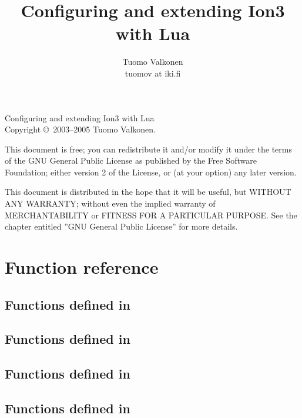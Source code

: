 \documentclass[english,a4paper,11pt,oldtoc,mctitle]{rapport3}
\title{Configuring and extending Ion3 with Lua}
\author{Tuomo Valkonen \\ tuomov at iki.fi}
\begin{document}
\maketitle

Configuring and extending Ion3 with Lua\\
Copyright \copyright\  2003--2005 Tuomo Valkonen.

This document is free; you can redistribute it and/or modify
it under the terms of the GNU General Public License as published by
the Free Software Foundation; either version 2 of the License, or
(at your option) any later version.

This document is distributed in the hope that it will be useful,
but WITHOUT ANY WARRANTY; without even the implied warranty of
MERCHANTABILITY or FITNESS FOR A PARTICULAR PURPOSE.  See the
chapter entitled ''GNU General Public License'' for more details.

\tableofcontents











\chapter{Function reference}
\label{sec:exports}

\section{Functions defined in }
\label{sec:ioncoreref}


\section{Functions defined in }
\label{sec:ionwsref}


\section{Functions defined in }
\label{sec:floatwsref}


\section{Functions defined in }
\label{sec:panewsref}

\end{document}
